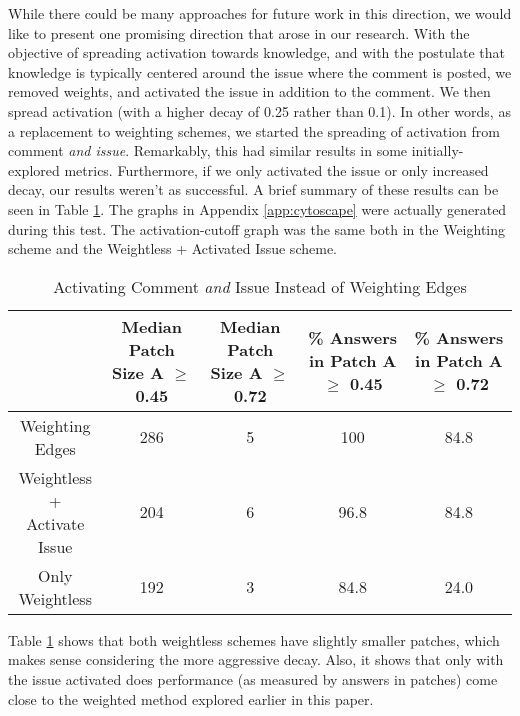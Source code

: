 While there could be many approaches for future work in this direction, we would like to present one promising direction that arose in our research. With the objective of spreading activation towards knowledge, and with the postulate that knowledge is typically centered around the issue where the comment is posted, we removed weights, and activated the issue in addition to the comment. We then spread activation (with a higher decay of 0.25 rather than 0.1). In other words, as a replacement to weighting schemes, we started the spreading of activation from comment \textit{and issue}. Remarkably, this had similar results in some initially-explored metrics. Furthermore, if we only activated the issue or only increased decay, our results weren't as successful. A brief summary of these results can be seen in Table \ref{tab:weightless}. The graphs in Appendix \ref{app:cytoscape} were actually generated during this test. The activation-cutoff graph was the same both in the Weighting scheme and the Weightless + Activated Issue scheme.

\begin{table}[ht]
	\caption{Activating Comment \textit{and} Issue Instead of Weighting Edges}
	\centering
	\begin{tabular}{ |c||c|c|c|c|  }
		\hline
		& \makecell{ Median Patch \\ Size A $\geq$ 0.45} & \makecell{ Median Patch \\ Size A $\geq$ 0.72} & \makecell{ \% Answers in \\ Patch A $\geq$ 0.45} & \makecell{ \% Answers in \\ Patch A $\geq$ 0.72} \\
		\hline
		\makecell{Weighting \\ Edges} & 286 & 5 & 100 & 84.8 \\
		\makecell{ Weightless + \\ Activate Issue} & 204 & 6 & 96.8 & 84.8 \\
		\hline
		Only Weightless & 192 & 3 & 84.8 & 24.0 \\
		\hline
	\end{tabular}
	\label{tab:weightless}
\end{table}

Table \ref{tab:weightless} shows that both weightless schemes have slightly smaller patches, which makes sense considering the more aggressive decay. Also, it shows that only with the issue activated does performance (as measured by answers in patches) come close to the weighted method explored earlier in this paper.

